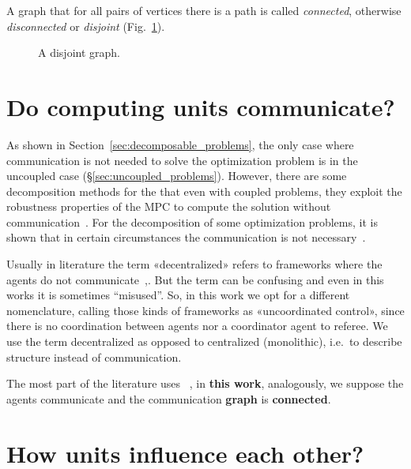 \documentclass[../main.tex]{subfiles}
\begin{document}
A graph that for all pairs of vertices there is a path is called \emph{connected}, otherwise \emph{disconnected} or \emph{disjoint} (Fig.~\ref{fig:disjoint}).

\begin{figure}[h]
  \centering
  \caption{A disjoint graph.}\label{fig:disjoint}
\end{figure}

\newpage
\section{Do computing units communicate?}

As shown in Section~\ref{sec:decomposable_problems}, the only case where communication is not needed to solve the optimization problem is in the uncoupled case (\S\ref{sec:uncoupled_problems}).
However, there are some decomposition methods for the \dmpc{} that even with coupled problems, they exploit the robustness properties of the MPC to compute the solution without communication~\cite{VahidNaghaviEtAl2014}.
For the decomposition of some optimization problems, it is shown that in certain circumstances the communication is not necessary~\cite{VoulgarisElia2022}.
\begin{remark}
  Usually in \dmpc{} literature the term «decentralized» refers to frameworks where the agents do not communicate~\cite[\S 4]{ChristofidesEtAl2013},\cite{NegenbornMaestre2014}.
  But the term can be confusing and even in this works it is sometimes ``misused''.
  So, in this work we opt for a different nomenclature, calling those kinds of frameworks as «uncoordinated control», since there is no coordination between agents nor a coordinator agent to referee. We use the term decentralized as opposed to centralized (monolithic), i.e.\ to describe structure instead of communication.
\end{remark}

The most part of the literature uses \emph{\coordinated}~\cite{NegenbornMaestre2014, ArauzEtAl2021}, in \textbf{this work}, analogously, we suppose the agents communicate and the communication \textbf{graph} is \textbf{connected}.

\section{How units influence each other?}
\end{document}
